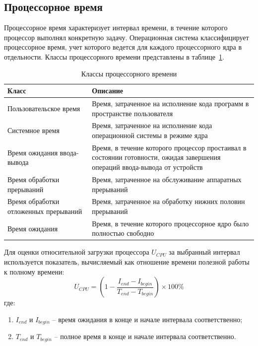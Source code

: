 \subsection{Процессорное время}

Процессорное время характеризует интервал времени, в течение которого процессор выполнял конкретную задачу. Операционная система классифицирует процессорное время, учет которого ведется для каждого процессорного ядра в отдельности. Классы процессорного времени представлены в таблице~\ref{tbl:processor-time-types}.

\begin{table}[H]
	\centering
	\caption{Классы процессорного времени}
	\label{tbl:processor-time-types}
	\begin{tabularx}{\textwidth}{|p{4cm}|X|}
		\hline
		\textbf{Класс} & \textbf{Описание} \\
		\hline
		Пользовательское время & Время, затраченное на исполнение кода программ в пространстве пользователя \\
		\hline
		Системное время & Время, затраченное на исполнение кода операционной системы в режиме ядра \\
		\hline
		Время ожидания ввода-вывода & Время, в течение которого процессор простаивал в состоянии готовности, ожидая завершения операций ввода-вывода от устройств \\
		\hline
		Время обработки прерываний & Время, затраченное на обслуживание аппаратных прерываний \\
		\hline
		Время обработки отложенных прерываний & Время, затраченное на обработку нижних половин прерываний \\
		\hline
		Время ожидания & Время, в течение которого процессорное ядро было полностью свободно \\
		\hline
	\end{tabularx}
\end{table}

\newpage

Для оценки относительной загрузки процессора $U_{CPU}$ за выбранный интервал используется показатель, вычисляемый как отношение времени полезной работы к полному времени:
\begin{equation}
	U_{CPU} = (1 - \frac{I_{end} - I_{begin}}{T_{end} - T_{begin}}) \times 100\%
\end{equation}
где:
\begin{enumerate}
	\item $I_{end}$ и $I_{begin}$ -- время ожидания в конце и начале интервала соответственно;
	\item $T_{end}$ и $T_{begin}$ -- полное время в конце и начале интервала соответственно.
\end{enumerate}

